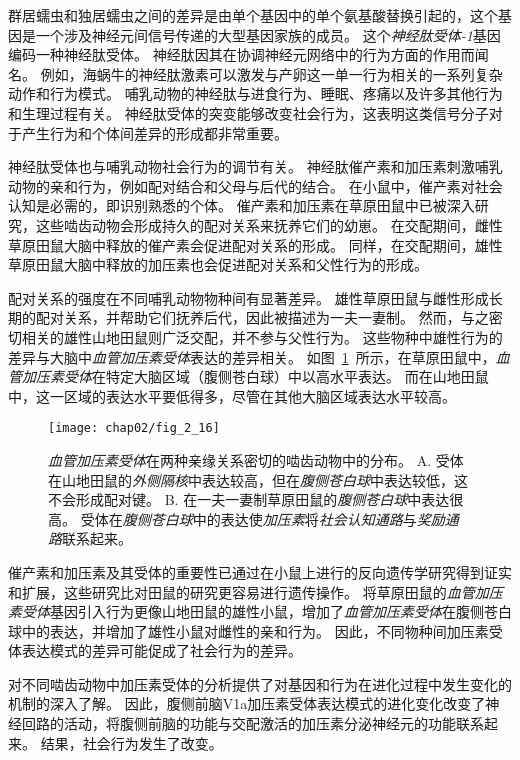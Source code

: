 群居蠕虫和独居蠕虫之间的差异是由单个基因中的单个氨基酸替换引起的，这个基因是一个涉及神经元间信号传递的大型基因家族的成员。
这个\textit{神经肽受体-1}基因编码一种神经肽受体。
神经肽因其在协调神经元网络中的行为方面的作用而闻名。
例如，海蜗牛的神经肽激素可以激发与产卵这一单一行为相关的一系列复杂动作和行为模式。
哺乳动物的神经肽与进食行为、睡眠、疼痛以及许多其他行为和生理过程有关。
神经肽受体的突变能够改变社会行为，这表明这类信号分子对于产生行为和个体间差异的形成都非常重要。


神经肽受体也与哺乳动物社会行为的调节有关。
神经肽催产素和加压素刺激哺乳动物的亲和行为，例如配对结合和父母与后代的结合。
在小鼠中，催产素对社会认知是必需的，即识别熟悉的个体。
催产素和加压素在草原田鼠中已被深入研究，这些啮齿动物会形成持久的配对关系来抚养它们的幼崽。
在交配期间，雌性草原田鼠大脑中释放的催产素会促进配对关系的形成。
同样，在交配期间，雄性草原田鼠大脑中释放的加压素也会促进配对关系和父性行为的形成。



配对关系的强度在不同哺乳动物物种间有显著差异。
雄性草原田鼠与雌性形成长期的配对关系，并帮助它们抚养后代，因此被描述为一夫一妻制。
然而，与之密切相关的雄性山地田鼠则广泛交配，并不参与父性行为。
这些物种中雄性行为的差异与大脑中\textit{血管加压素受体}表达的差异相关。
如图~\ref{fig:2_16}~所示，在草原田鼠中，\textit{血管加压素受体}在特定大脑区域（腹侧苍白球）中以高水平表达。 
而在山地田鼠中，这一区域的表达水平要低得多，尽管在其他大脑区域表达水平较高。


\begin{figure}[htbp]
	\centering
	\texttt{[image: chap02/fig\_2\_16]}
	\caption{\textit{血管加压素受体}在两种亲缘关系密切的啮齿动物中的分布\cite{young2001cellular}。
		A. 受体在山地田鼠的\textit{外侧隔核}中表达较高，但在\textit{腹侧苍白球}中表达较低，这不会形成配对键。
		B. 在一夫一妻制草原田鼠的\textit{腹侧苍白球}中表达很高。
		受体在\textit{腹侧苍白球}中的表达使\textit{加压素}将\textit{社会认知通路}与\textit{奖励通路}联系起来。}
	\label{fig:2_16}
\end{figure}


催产素和加压素及其受体的重要性已通过在小鼠上进行的反向遗传学研究得到证实和扩展，这些研究比对田鼠的研究更容易进行遗传操作。
将草原田鼠的\textit{血管加压素受体}基因引入行为更像山地田鼠的雄性小鼠，增加了\textit{血管加压素受体}在腹侧苍白球中的表达，并增加了雄性小鼠对雌性的亲和行为。
因此，不同物种间加压素受体表达模式的差异可能促成了社会行为的差异。





对不同啮齿动物中加压素受体的分析提供了对基因和行为在进化过程中发生变化的机制的深入了解。
因此，腹侧前脑V1a加压素受体表达模式的进化变化改变了神经回路的活动，将腹侧前脑的功能与交配激活的加压素分泌神经元的功能联系起来。
结果，社会行为发生了改变。

